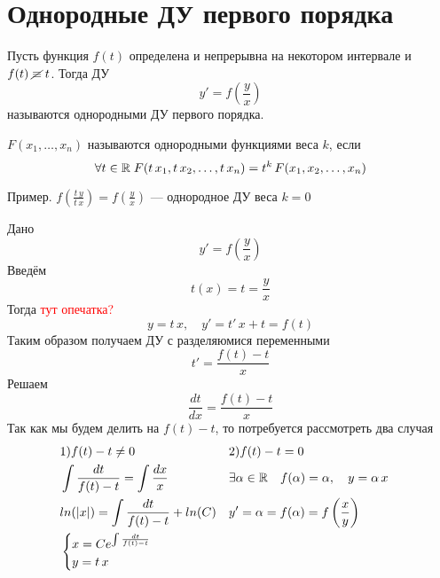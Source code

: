 \author{Tkachuk Andrei}

\section{Однородные ДУ первого порядка}

\begin{Def}
    Пусть функция $f(t)$ определена и непрерывна на некотором интервале и $f(t)\; \cancel{\equiv}\; t$. Тогда ДУ 
    \[
        y' = f\left(\frac{y}{x}\right)
    \]
    называются однородными ДУ первого порядка.
\end{Def}

\begin{Note}
    $F(x_1, \dots, x_n)$ называются однородными функциями веса $k$, если 
    \[
        \forall t \in \mathbb{R} \; F(t\,x_1, t\,x_2, \dots, t\,x_n) = t^k\,F(x_1, x_2, \dots, x_n)
    \]
    
    Пример. $f(\frac{t\,y}{t\,x}) = f(\frac{y}{x})$ --- однородное ДУ веса $k = 0$
\end{Note}
\begin{Note} 
    Дано 
    \[
        y' = f\left(\frac{y}{x}\right)
    \]
    Введём 
    \[
        t(x) = t = \frac{y}{x}
    \]
    Тогда
    \textcolor{red}{тут опечатка?}
    \[
        y = t\,x, \quad y' = t'\,x + t = f(t)
    \]
    Таким образом получаем ДУ с разделяюмися переменными
    \[
        t' = \frac{f(t) - t}{x}
    \]
    Решаем
    \[
        \frac{dt}{dx} = \frac{f(t) - t}{x}
    \]
    Так как мы будем делить на $f(t) - t$, то потребуется рассмотреть два случая
    \begin{align*}
        &1) f(t) - t \neq 0& &2) f(t) - t = 0&\\
        &\int\frac{dt}{f(t) - t} = \int \frac{dx}{x}& &\exists\alpha \in \mathbb{R} \quad f(\alpha) = \alpha, \quad y = \alpha\,x&\\
        &ln(|x|) = \int \frac{dt}{f(t) - t} + ln(C)& &y'=\alpha= f(\alpha) = f\left(\frac{x}{y}\right)&\\
        &\begin{cases}
            x = Ce^{\int \frac{dt}{f(t) - t}}\\
            y = t\,x
        \end{cases}&
    \end{align*}
\end{Note}

